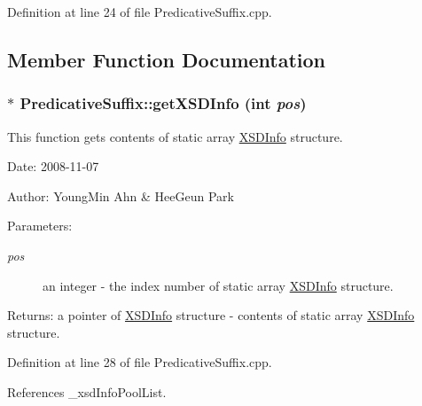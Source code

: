 Definition at line 24 of file PredicativeSuffix.cpp.

\subsection{Member Function Documentation}
\hypertarget{classkmaOrange_1_1PredicativeSuffix_b1e30cd19e2058472393a95d52939cab}{
\subsubsection[{getXSDInfo}]{ $\ast$ PredicativeSuffix::getXSDInfo (int {\em pos})}}
\label{classkmaOrange_1_1PredicativeSuffix_b1e30cd19e2058472393a95d52939cab}


This function gets contents of static array \hyperlink{structkmaOrange_1_1XSDInfo}{XSDInfo} structure. 

\begin{Desc}
\item[Date:]2008-11-07 \end{Desc}
\begin{Desc}
\item[Author:]YoungMin Ahn \& HeeGeun Park \end{Desc}
\begin{Desc}
\item[Parameters:]
\begin{description}
\item[{\em pos}]an integer - the index number of static array \hyperlink{structkmaOrange_1_1XSDInfo}{XSDInfo} structure. \end{description}
\end{Desc}
\begin{Desc}
\item[Returns:]a pointer of \hyperlink{structkmaOrange_1_1XSDInfo}{XSDInfo} structure - contents of static array \hyperlink{structkmaOrange_1_1XSDInfo}{XSDInfo} structure. \end{Desc}


Definition at line 28 of file PredicativeSuffix.cpp.

References \_\-xsdInfoPoolList.


